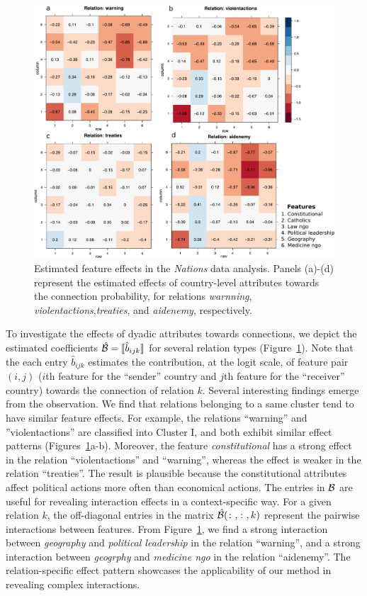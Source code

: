 \documentclass[12pt]{article}
\theoremstyle{definition}
\theoremstyle{definition}
\begin{document}
\begin{figure}[!h]
\centering
\includegraphics[width=12cm]{coef.pdf}
\caption{Estimated feature effects in the \emph{Nations} data analysis. Panels (a)-(d) represent the estimated effects of country-level attributes towards the connection probability, for relations \emph{warnning}, \emph{violentactions},\emph{treaties}, and \emph{aidenemy}, respectively. }\label{fig:est}
\end{figure}

To investigate the effects of dyadic attributes towards connections, we depict the estimated coefficients $\hat {\mathcal{B}}=\llbracket \hat b_{ijk} \rrbracket$ for several relation types (Figure~\ref{fig:est}). Note that the each entry $\hat b_{ijk}$ estimates the contribution, at the logit scale, of feature pair $(i,j)$ ($i$th feature for the ``sender'' country and $j$th feature for the ``receiver'' country) towards the connection of relation $k$. Several interesting findings emerge from the observation. We find that relations belonging to a same cluster tend to have similar feature effects. For example, the relations ``warning'' and ''violentactions'' are classified into Cluster I, and both exhibit similar effect patterns (Figures~\ref{fig:est}a-b). Moreover, the feature \emph{constitutional} has a strong effect in the relation ``violentactions'' and ``warning'', whereas the effect is weaker in the relation ``treaties''. The result is plausible because the constitutional attributes affect political actions more often than economical actions. The entries in $\mathcal{B}$ are useful for revealing interaction effects in a context-specific way. For a given relation $k$, the off-diagonal entries in the matrix $\hat {\mathcal{B}}(\colon,\colon,k)$ represent the pairwise interactions between features. From Figure~\ref{fig:est}, we find a strong interaction between \emph{geography} and \emph{political leadership} in the relation ``warning'', and a strong interaction between \emph{geogrphy} and \emph{medicine ngo} in the relation ``aidenemy''. The relation-specific effect pattern showcases the applicability of our method in revealing complex interactions. 
\end{document}
